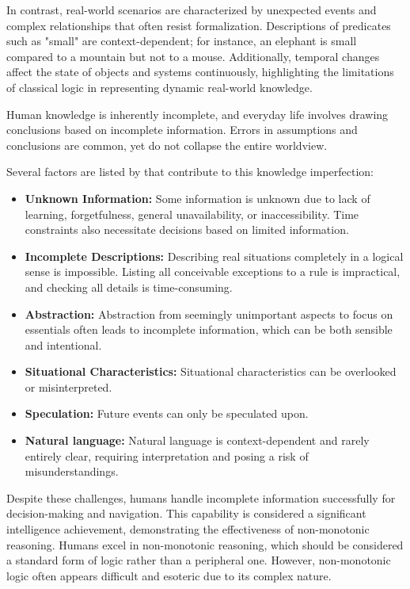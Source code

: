 In contrast, real-world scenarios are characterized by unexpected events and complex relationships that often resist formalization.
Descriptions of predicates such as "small" are context-dependent; for instance, an elephant is small compared to a mountain but not to a mouse.
Additionally, temporal changes affect the state of objects and systems continuously, highlighting the limitations of classical logic in representing dynamic real-world knowledge.

Human knowledge is inherently incomplete, and everyday life involves drawing conclusions based on incomplete information.
Errors in assumptions and conclusions are common, yet do not collapse the entire worldview.

Several factors are listed by \cite{beierle_methoden_2019} that contribute to this knowledge imperfection:
\begin{itemize}
      \item \textbf{Unknown Information:} Some information is unknown due to lack of learning, forgetfulness, general unavailability, or inaccessibility.
            Time constraints also necessitate decisions based on limited information.
      \item \textbf{Incomplete Descriptions:} Describing real situations completely in a logical sense is impossible.
            Listing all conceivable exceptions to a rule is impractical, and checking all details is time-consuming.
      \item \textbf{Abstraction:} Abstraction from seemingly unimportant aspects to focus on essentials often leads to incomplete information, which can be both sensible and intentional.
      \item \textbf{Situational Characteristics:} Situational characteristics can be overlooked or misinterpreted.
      \item \textbf{Speculation:} Future events can only be speculated upon.
      \item \textbf{Natural language:} Natural language is context-dependent and rarely entirely clear, requiring interpretation and posing a risk of misunderstandings.
\end{itemize}

Despite these challenges, humans handle incomplete information successfully for decision-making and navigation.
This capability is considered a significant intelligence achievement, demonstrating the effectiveness of non-monotonic reasoning.
Humans excel in non-monotonic reasoning, which should be considered a standard form of logic rather than a peripheral one.
However, non-monotonic logic often appears difficult and esoteric due to its complex nature.

